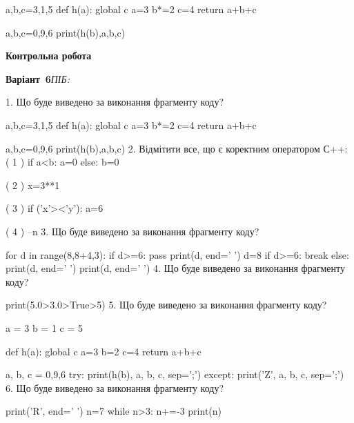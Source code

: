\documentclass[11pt]{article}
\begin{document}
a,b,c=3,1,5
def h(a):
global c    a=3
    b*=2
    c=4
    return a+b+c

a,b,c=0,9,6
print(h(b),a,b,c)
\vspace{5mm}










\newpage

\newpage

{\large\textbf{Контрольна робота}}

\textbf{Варіант \No\,6}\hfill \textit{ПІБ:}\,\underline{\hspace{60mm}}
\vspace{4mm}

1. Що буде виведено за виконання фрагменту коду?

a,b,c=3,1,5
def h(a):
global c    a=3
    b*=2
    c=4
    return a+b+c

a,b,c=0,9,6
print(h(b),a,b,c)
\vspace{5mm}
2. %
Відмітити все, що є коректним оператором С++:
( 1 ) if a<b: a=0 else: b=0

( 2 ) x=3**1

( 3 ) if ('x'><'y'): a=6

( 4 ) --n
\vspace{5mm}
3. Що буде виведено за виконання фрагменту коду?

for d in range(8,8+4,3):
    if d>=6:
        pass
    print(d, end=' ')
    d=8
    if d>=6:
        break
else:
    print(d, end=' ')
print(d, end=' ')
\vspace{5mm}
4. Що буде виведено за виконання фрагменту коду?

print(5.0>3.0>True>5)
\vspace{5mm}
5. Що буде виведено за виконання фрагменту коду?

a = 3
b = 1
c = 5

def h(a):
global c    a=3
    b=2
    c=4
    return a+b+c

a, b, c = 0,9,6
try:
    print(h(b), a, b, c, sep=';')
except:
    print('Z', a, b, c, sep=';')
\vspace{5mm}
6. Що буде виведено за виконання фрагменту коду?

print('R', end=' ')
n=7
while n>3:
    n+=-3
print(n)
\end{document}
